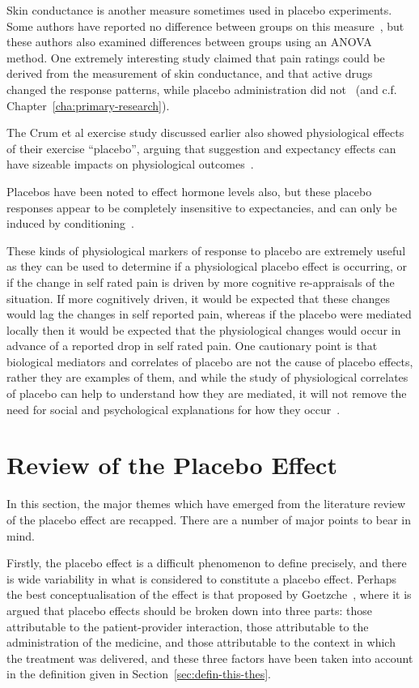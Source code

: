 Skin conductance is another measure sometimes used in placebo experiments. Some authors have reported no difference between groups on this measure~\cite{Flaten1999}, but these authors also examined differences between groups using an ANOVA method. One extremely interesting study claimed that pain ratings could be derived from the measurement of skin conductance, and that active drugs changed the response patterns, while placebo administration did not~\cite{Fujita2000} (and c.f. Chapter~\ref{cha:primary-research}).

The Crum et al exercise study discussed earlier also showed physiological effects of their exercise ``placebo'', arguing that suggestion and expectancy effects can have sizeable impacts on physiological outcomes~\cite{Crum2007}.

Placebos have been noted to effect hormone levels also, but these placebo responses appear to be completely insensitive to expectancies, and can only be induced by conditioning~\cite{benedetti2003a}. 

These kinds of physiological markers of response to placebo are extremely useful as they can be used to determine if a physiological placebo effect is occurring, or if the change in self rated pain is driven by more cognitive re-appraisals of the situation. If more cognitively driven, it would be expected that these changes would lag the changes in self reported pain, whereas if the placebo were mediated locally then it would be expected that the physiological changes would occur in advance of a reported drop in self rated pain. One cautionary point is that biological mediators and correlates of placebo are not the cause of placebo effects, rather they are examples of them, and while the study of physiological correlates of placebo can help to understand how they are mediated, it will not remove the need for social and psychological explanations for how they occur~\cite{Stewart-Williams2004b}. 


\section{Review of the Placebo Effect}
\label{sec:revi-plac-effect}

In this section, the major themes which have emerged from the literature review of the placebo effect are recapped. There are a number of major points to bear in mind. 

Firstly, the placebo effect is a difficult phenomenon to define precisely, and there is wide variability in what is considered to constitute a placebo effect. Perhaps the best conceptualisation of the effect is that proposed by Goetzche~\cite{Gotzsche1995}, where it is argued that placebo effects should be broken down into three parts: those attributable to the patient-provider interaction, those attributable to the administration of the medicine, and those attributable to the context in which the treatment was delivered, and these three factors have been taken into account in the definition given in Section~\ref{sec:defin-this-thes}. 

